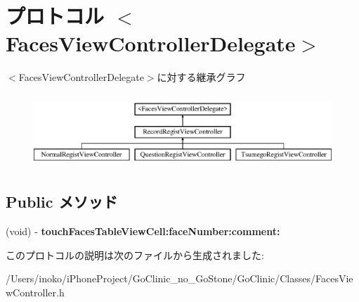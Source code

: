 \hypertarget{protocol_faces_view_controller_delegate-p}{
\section{プロトコル $<$FacesViewControllerDelegate$>$}
\label{protocol_faces_view_controller_delegate-p}
}
$<$FacesViewControllerDelegate$>$に対する継承グラフ\begin{figure}[H]
\begin{center}
\leavevmode
\includegraphics[height=2.758621cm]{protocol_faces_view_controller_delegate-p}
\end{center}
\end{figure}
\subsection*{Public メソッド}
\begin{DoxyCompactItemize}
\item 
\hypertarget{protocol_faces_view_controller_delegate-p_af778e59e5e7498c50e72c656f3981599}{
(void) -\/ {\bfseries touchFacesTableViewCell:faceNumber:comment:}}
\label{protocol_faces_view_controller_delegate-p_af778e59e5e7498c50e72c656f3981599}

\end{DoxyCompactItemize}


このプロトコルの説明は次のファイルから生成されました:\begin{DoxyCompactItemize}
\item 
/Users/inoko/iPhoneProject/GoClinic\_\-no\_\-GoStone/GoClinic/Classes/FacesViewController.h\end{DoxyCompactItemize}
